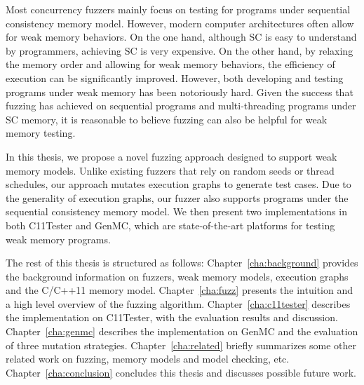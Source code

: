 
Most concurrency fuzzers mainly focus on testing for programs under sequential consistency memory model. However, modern computer architectures often allow for weak memory behaviors. On the one hand, although SC is easy to understand by programmers, achieving SC is very expensive. On the other hand, by relaxing the memory order and allowing for weak memory behaviors, the efficiency of execution can be significantly improved. However, both developing and testing programs under weak memory has been notoriously hard. Given the success that fuzzing has achieved on sequential programs and multi-threading programs under SC memory, it is reasonable to believe fuzzing can also be helpful for weak memory testing. 


In this thesis, we propose a novel fuzzing approach designed to support weak memory models. Unlike existing fuzzers that rely on random seeds or thread schedules, our approach mutates execution graphs to generate test cases. Due to the generality of execution graphs, our fuzzer also supports programs under the sequential consistency memory model. We then present two implementations in both C11Tester and GenMC, which are state-of-the-art platforms for testing weak memory programs.


The rest of this thesis is structured as follows: Chapter~\ref{cha:background} provides the background information on fuzzers, weak memory models, execution graphs and the C/C++11 memory model. Chapter~\ref{cha:fuzz} presents the intuition and a high level overview of the fuzzing algorithm. Chapter~\ref{cha:c11tester} describes the implementation on C11Tester, with the evaluation results and discussion. Chapter~\ref{cha:genmc} describes the implementation on GenMC and the evaluation of three mutation strategies. Chapter~\ref{cha:related} briefly summarizes some other related work on fuzzing, memory models and model checking, etc. Chapter~\ref{cha:conclusion} concludes this thesis and discusses possible future work. 





